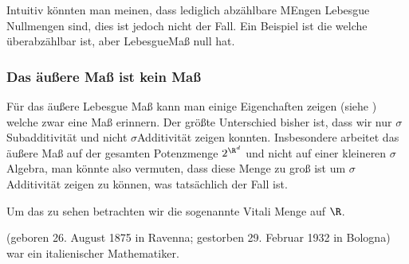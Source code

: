 \documentclass[letterpaper,10pt,english]{jupyterBook}
\begin{document}
\sphinxAtStartPar
Intuitiv könnten man meinen, dass lediglich abzählbare MEngen Lebesgue Nullmengen sind, dies ist jedoch nicht der Fall. Ein Beispiel ist die  welche überabzählbar ist, aber Lebesgue\sphinxhyphen{}Maß null hat.


\subsubsection{Das äußere Maß ist kein Maß}
\label{\detokenize{masstheorie/masstheorie:das-auszere-masz-ist-kein-masz}}
\sphinxAtStartPar
Für das äußere Lebesgue Maß kann man einige Eigenchaften zeigen (siehe {\hyperref[\detokenize{masstheorie/masstheorie:thm:outerlebesgue}]{}}) welche zwar eine Maß erinnern. Der größte Unterschied bisher ist, dass wir nur \(\sigma\)\sphinxhyphen{}Subadditivität und nicht \(\sigma\)\sphinxhyphen{}Additivität zeigen konnten. Insbesondere arbeitet das äußere Maß auf der gesamten Potenzmenge \(2^{\R^d}\) und nicht auf einer kleineren \(\sigma\)\sphinxhyphen{}Algebra, man könnte also vermuten, dass diese Menge zu groß ist um \(\sigma\)\sphinxhyphen{}Additivität zeigen zu können, was tatsächlich der Fall ist.

\sphinxAtStartPar
Um das zu sehen betrachten wir die sogenannte Vitali Menge auf \(\R\).

\begin{sphinxShadowBox}

\sphinxAtStartPar
{} (geboren 26. August 1875 in Ravenna; gestorben 29. Februar 1932 in Bologna) war ein italienischer Mathematiker.
\end{sphinxShadowBox}
\end{document}
